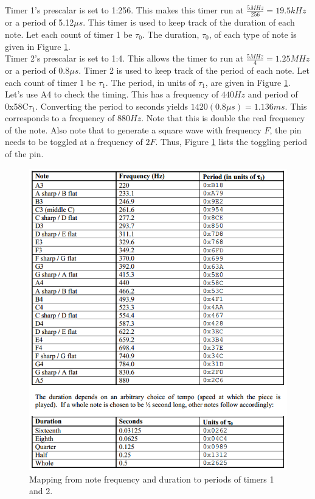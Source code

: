 \documentclass[11pt]{article}
\begin{document}
Timer 1's prescalar is set to 1:256. This makes this timer run at $\frac{5MHz}{256} = 19.5kHz$ or a period of 5.12$\mu s$. This timer is used to keep track of the duration of each note. Let each count of timer 1 be $\tau_{0}$. The duration, $\tau_{0}$, of each type of note is given in Figure \ref{fig:freq_and_dur}. \\

Timer 2's prescalar is set to 1:4. This allows the timer to run at $\frac{5MHz}{4} = 1.25MHz$ or a period of 0.8$\mu s$. Timer 2 is used to keep track of the period of each note. Let each count of timer 1 be $\tau_{1}$. The period, in units of $\tau_{1}$, are given in Figure \ref{fig:freq_and_dur}. Let's use A4 to check the timing. This has a frequency of $440Hz$ and period of 0x58C$\tau_{1}$. Converting the period to seconds yields $1420(0.8\mu s) = 1.136ms$. This corresponds to a frequency of $880Hz$. Note that this is double the real frequency of the note. Also note that to generate a square wave with frequency $F$, the pin needs to be toggled at a frequency of $2F$. Thus, Figure \ref{fig:freq_and_dur} lists the toggling period of the pin. \\

\begin{figure}[h!]
\centering
\includegraphics[scale=0.8]{notes_and_duration.png}
\caption{Mapping from note frequency and duration to periods of timers 1 and 2.}
\label{fig:freq_and_dur}
\end{figure} 
\end{document}
